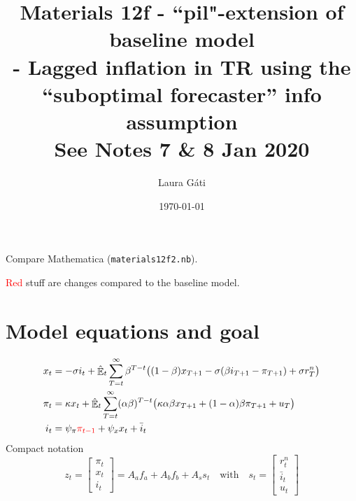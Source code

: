 \documentclass[11pt]{article}
\renewcommand{\[}{\begin{equation}}
\renewcommand{\]}{\end{equation}}
\DeclareMathOperator{\E}{\mathbb{E}}
\begin{document}
\linespread{1.0}

\title{Materials 12f - ``pil"-extension of baseline model\\
- Lagged inflation in TR using the ``suboptimal forecaster'' info assumption
\\
\small{See Notes 7 \& 8 Jan 2020}}
\author{Laura G\'ati} 
\date{\today}
\maketitle




Compare Mathematica (\texttt{materials12f2.nb}).

\textcolor{red}{Red} stuff are changes compared to the baseline model.
\section{Model equations and goal}
\begin{align}
x_t &=  -\sigma i_t +\hat{\E}_t \sum_{T=t}^{\infty} \beta^{T-t }\big( (1-\beta)x_{T+1} - \sigma(\beta i_{T+1} - \pi_{T+1}) +\sigma r_T^n \big)  \label{prestons18}  \\
\pi_t &= \kappa x_t +\hat{\E}_t \sum_{T=t}^{\infty} (\alpha\beta)^{T-t }\big( \kappa \alpha \beta x_{T+1} + (1-\alpha)\beta \pi_{T+1} + u_T\big) \label{prestons19}  \\
i_t &= \psi_{\pi}\textcolor{red}{\pi_{t-1}}+ \psi_{x} x_t  + \bar{i}_t \label{TR}
\end{align}
Compact notation
\begin{equation}
z_t = \begin{bmatrix} \pi_t \\ x_t \\ i_t \end{bmatrix} = A_a f_{a} + A_b f_{b} + A_s s_t \quad \text{with} \quad  s_t = \begin{bmatrix} r_t^n \\ \bar{i}_t \\ u_t \end{bmatrix}
\end{equation}
\end{document}
